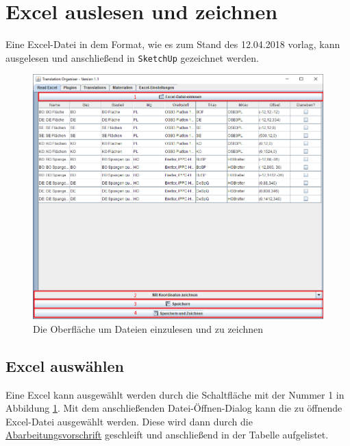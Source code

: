 \documentclass{book}
\newcommand{\sketchup}{\texttt{SketchUp}\xspace}
\begin{document}
		\section{Excel auslesen und zeichnen}
			Eine Excel-Datei in dem Format, wie es zum Stand des 12.04.2018 vorlag, kann ausgelesen und anschließend in \sketchup gezeichnet werden.
			\begin{figure}
				\centering
				\includegraphics[scale=0.48]{pics/assisttool/readExcel.png}
				\caption{Die Oberfläche um Dateien einzulesen und zu zeichnen}
				\label{fig:read Excel}
			\end{figure}
			\subsection{Excel auswählen}
				Eine Excel kann ausgewählt werden durch die Schaltfläche mit der Nummer 1 in Abbildung \ref{fig:read Excel}. Mit dem anschließenden Datei-Öffnen-Dialog kann die zu öffnende Excel-Datei ausgewählt werden. Diese wird dann durch die \hyperref[REC - Ablauf]{Abarbeitungsvorschrift} geschleift und anschließend in der Tabelle aufgelistet. 
\end{document}
